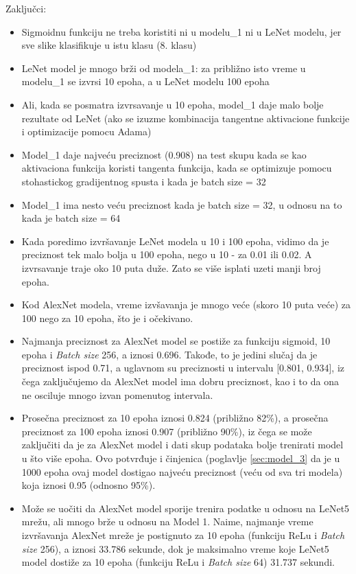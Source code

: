 \documentclass[a4paper]{article}
\begin{document}
\newpage
Zaključci:
\begin{itemize}
 \item Sigmoidnu funkciju ne treba koristiti ni u modelu\_1 ni u LeNet modelu, jer sve slike klasifikuje u istu klasu (8. klasu)
 \item LeNet model je mnogo brži od modela\_1: za približno isto vreme u modelu\_1 se izvrsi 10 epoha, a u LeNet modelu 100 epoha
 \item Ali, kada se posmatra izvrsavanje u 10 epoha, model\_1 daje malo bolje rezultate od LeNet (ako se izuzme kombinacija tangentne aktivacione funkcije i optimizacije pomocu Adama)
 \item Model\_1 daje najveću preciznost (0.908) na test skupu kada se kao aktivaciona funkcija koristi tangenta funkcija, kada se optimizuje pomocu stohastickog gradijentnog spusta i kada je batch size = 32
 \item Model\_1 ima nesto veću preciznost kada je batch size = 32, u odnosu na to kada je batch size = 64
 \item Kada poredimo izvršavanje LeNet modela u 10 i 100 epoha, vidimo da je preciznost tek malo bolja u 100 epoha, nego u 10 - za 0.01 ili 0.02. A izvrsavanje traje oko 10 puta duže. Zato se više isplati uzeti manji broj epoha.
 \item Kod AlexNet modela, vreme izvšavanja je mnogo veće (skoro 10 puta veće) za 100 nego za 10 epoha, što je i očekivano.
 \item Najmanja preciznost za AlexNet model se postiže za funkciju sigmoid, 10 epoha i \textit{Batch size} 256, a iznosi 0.696. Takođe, to je jedini slučaj da je preciznost ispod 0.71, a uglavnom su preciznosti u intervalu [0.801, 0.934], iz čega zaključujemo da AlexNet model ima dobru preciznost, kao i to da ona ne osciluje mnogo izvan pomenutog intervala.
 \item Prosečna preciznost za 10 epoha iznosi 0.824 (približno 82\%), a prosečna preciznost za 100 epoha iznosi 0.907 (približno 90\%), iz čega se može zaključiti da je za AlexNet model i dati skup podataka bolje trenirati model u što više epoha. Ovo potvrđuje i činjenica (poglavlje \ref{sec:model_3} da je u 1000 epoha ovaj model dostigao najveću preciznost (veću od sva tri modela) koja iznosi 0.95 (odnosno 95\%).
  \item Može se uočiti da AlexNet model sporije trenira podatke u odnosu na LeNet5 mrežu, ali mnogo brže u odnosu na Model 1. Naime, najmanje vreme izvršavanja AlexNet mreže je postignuto za 10 epoha (funkciju ReLu i \textit{Batch size} 256), a iznosi 33.786 sekunde, dok je maksimalno vreme koje LeNet5 model dostiže za 10 epoha (funkciju ReLu i \textit{Batch size} 64) 31.737 sekundi.
\end{itemize}
\end{document}
